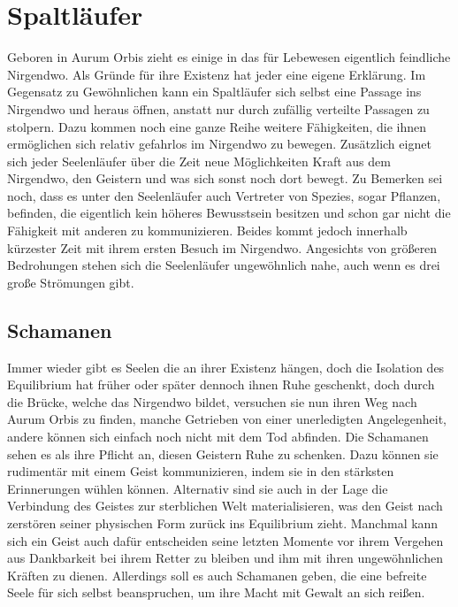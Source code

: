 \documentclass[a4paper,12pt,oneside]{book}
\begin{document}
\section{Spaltläufer}
Geboren in Aurum Orbis zieht es einige in das für Lebewesen eigentlich feindliche Nirgendwo. Als Gründe für ihre Existenz hat jeder eine eigene Erklärung. Im Gegensatz zu Gewöhnlichen kann ein Spaltläufer sich selbst eine Passage ins Nirgendwo und heraus öffnen, anstatt nur durch zufällig verteilte Passagen zu stolpern. Dazu kommen noch eine ganze Reihe weitere Fähigkeiten, die ihnen ermöglichen sich relativ gefahrlos im Nirgendwo zu bewegen. Zusätzlich eignet sich jeder Seelenläufer über die Zeit neue Möglichkeiten Kraft aus dem Nirgendwo, den Geistern und was sich sonst noch dort bewegt. Zu Bemerken sei noch, dass es unter den Seelenläufer auch Vertreter von Spezies, sogar Pflanzen, befinden, die eigentlich kein höheres Bewusstsein besitzen und schon gar nicht die Fähigkeit mit anderen zu kommunizieren. Beides kommt jedoch innerhalb kürzester Zeit mit ihrem ersten Besuch im Nirgendwo. Angesichts von größeren Bedrohungen stehen sich die Seelenläufer ungewöhnlich nahe, auch wenn es drei große Strömungen gibt.
\subsection{Schamanen}
Immer wieder gibt es Seelen die an ihrer Existenz hängen, doch die Isolation des Equilibrium hat früher oder später dennoch ihnen Ruhe geschenkt, doch durch die Brücke, welche das Nirgendwo bildet, versuchen sie nun ihren Weg nach Aurum Orbis zu finden, manche Getrieben von einer unerledigten Angelegenheit, andere können sich einfach noch nicht mit dem Tod abfinden. Die Schamanen sehen es als ihre Pflicht an, diesen Geistern Ruhe zu schenken. Dazu können sie rudimentär mit einem Geist kommunizieren, indem sie in den stärksten Erinnerungen wühlen können. Alternativ sind sie auch in der Lage die Verbindung des Geistes zur sterblichen Welt materialisieren, was den Geist nach zerstören seiner physischen Form zurück ins Equilibrium zieht. Manchmal kann sich ein Geist auch dafür entscheiden seine letzten Momente vor ihrem Vergehen aus Dankbarkeit bei ihrem Retter zu bleiben und ihm mit ihren ungewöhnlichen Kräften zu dienen. Allerdings soll es auch Schamanen geben, die eine befreite Seele für sich selbst beanspruchen, um ihre Macht mit Gewalt an sich reißen. 
\end{document}
